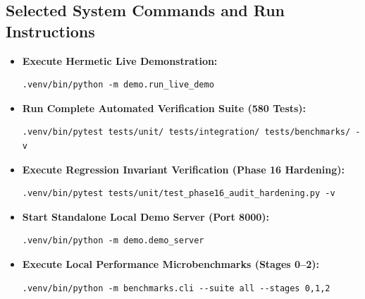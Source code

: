 \subsection{Selected System Commands and Run Instructions}
\begin{itemize}
    \item \textbf{Execute Hermetic Live Demonstration:}
\begin{verbatim}
.venv/bin/python -m demo.run_live_demo
\end{verbatim}
    \item \textbf{Run Complete Automated Verification Suite (580 Tests):}
\begin{verbatim}
.venv/bin/pytest tests/unit/ tests/integration/ tests/benchmarks/ -v
\end{verbatim}
    \item \textbf{Execute Regression Invariant Verification (Phase 16 Hardening):}
\begin{verbatim}
.venv/bin/pytest tests/unit/test_phase16_audit_hardening.py -v
\end{verbatim}
    \item \textbf{Start Standalone Local Demo Server (Port 8000):}
\begin{verbatim}
.venv/bin/python -m demo.demo_server
\end{verbatim}
    \item \textbf{Execute Local Performance Microbenchmarks (Stages 0--2):}
\begin{verbatim}
.venv/bin/python -m benchmarks.cli --suite all --stages 0,1,2
\end{verbatim}
\end{itemize}
